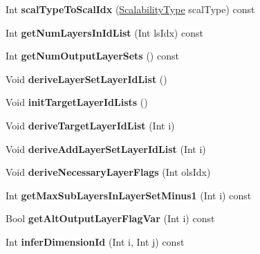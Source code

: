 \begin{DoxyCompactItemize}
Int {\bfseries scal\+Type\+To\+Scal\+Idx} (\hyperlink{_type_def_8h_a07802c9da35e1a2d39714383ead3ce41}{Scalability\+Type} scal\+Type) const
\item 
\mbox{\label{class_t_com_v_p_s_a574487fa2c968faa3152506154926b61}} 
Int {\bfseries get\+Num\+Layers\+In\+Id\+List} (Int ls\+Idx) const
\item 
\mbox{\label{class_t_com_v_p_s_a05eb933b13e39d485a24b8d0cc8b0792}} 
Int {\bfseries get\+Num\+Output\+Layer\+Sets} () const
\item 
\mbox{\label{class_t_com_v_p_s_a53e4dea609c2efd92e22e4ad80102431}} 
Void {\bfseries derive\+Layer\+Set\+Layer\+Id\+List} ()
\item 
\mbox{\label{class_t_com_v_p_s_a20c022676f9820cb7fb3cb93c1e1e4a2}} 
Void {\bfseries init\+Target\+Layer\+Id\+Lists} ()
\item 
\mbox{\label{class_t_com_v_p_s_a7e4c38250eefba0b6a1811d1da791235}} 
Void {\bfseries derive\+Target\+Layer\+Id\+List} (Int i)
\item 
\mbox{\label{class_t_com_v_p_s_ad5c3220d95b4f71449c4c4df5385099d}} 
Void {\bfseries derive\+Add\+Layer\+Set\+Layer\+Id\+List} (Int i)
\item 
\mbox{\label{class_t_com_v_p_s_a0c46bed58e3a41e143b1fcb9acfa7faf}} 
Void {\bfseries derive\+Necessary\+Layer\+Flags} (Int ols\+Idx)
\item 
\mbox{\label{class_t_com_v_p_s_a28c1b9ab39d4726b6155b40f76699169}} 
Int {\bfseries get\+Max\+Sub\+Layers\+In\+Layer\+Set\+Minus1} (Int i) const
\item 
\mbox{\label{class_t_com_v_p_s_a2adf5dae98b5d3b38333117e82990a10}} 
Bool {\bfseries get\+Alt\+Output\+Layer\+Flag\+Var} (Int i) const
\item 
\mbox{\label{class_t_com_v_p_s_acc629ed2f88a95046e83a39b88eae076}} 
Int {\bfseries infer\+Dimension\+Id} (Int i, Int j) const
\item 

\end{DoxyCompactItemize}
